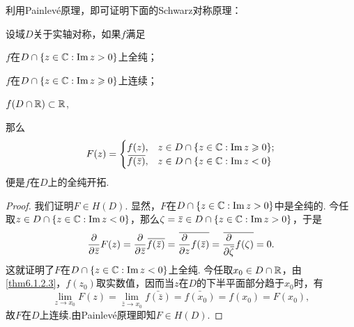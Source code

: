 利用Painlev\'e原理，即可证明下面的Schwarz对称原理：
\begin{theorem}\label{thm6.1.2}
设域$D$关于实轴对称，如果$f$满足
\begin{eenum}
  \item \label{thm6.1.2.1} $f$在$D\cap\{z\in\MC:\Im z>0\}$上全纯；
  \item \label{thm6.1.2.2} $f$在$D\cap\{z\in\MC:\Im z\ge0\}$上连续；
  \item \label{thm6.1.2.3} $f(D\cap\MR)\subset\MR$,
\end{eenum}
那么
\[F(z)=\begin{cases}
f(z),&z\in D\cap\{z\in \MC:\Im z\ge0\};\\
\bar{f(\bar z)},&z\in D\cap \{z\in\MC:\Im z<0\}
\end{cases}\]
便是$f$在$D$上的全纯开拓.
\end{theorem}
\begin{proof}
我们证明$F\in H(D)$. 显然，$F$在$D\cap\{z\in\MC:\Im z>0\}$中是全纯的. 今任取$z\in D\cap\{z\in\MC:\Im z<0\}$，那么$\zeta=\bar z\in D\cap\{z\in\MC:\Im z>0\}$，于是
\[\pp{}{\bar z}F(z)=\pp{}{\bar z}\bar{f(\bar z)}=\bar{\pp{}zf(\bar z)}
=\bar{\pp{}{\bar\zeta}f(\zeta)}=0.\]
这就证明了$F$在$D\cap\{z\in\MC:\Im z<0\}$上全纯. 今任取$x_0\in D\cap\MR$，由 \ref{thm6.1.2.3}，$f(z_0)$取实数值，因而当$z$在$D$的下半平面部分趋于$x_0$时，有
\[\lim_{z\to x_0}F(z)=\lim_{\bar z\to x_0}\bar{f(\bar z)}=\bar{f(x_0)}
=f(x_0)=F(x_0),\]
故$F$在$D$上连续.由Painlev\'e原理即知$F\in H(D)$.
\end{proof}

